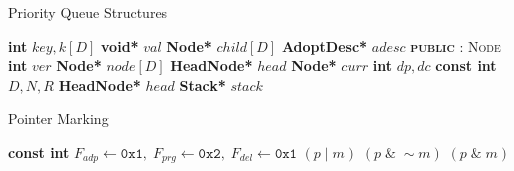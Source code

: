 \documentclass[10pt,journal,letter,compsoc]{IEEEtran}
\begin{document}
\setlength{\columnsep}{8pt}
\begin{algorithm}[t]
    \caption{Priority Queue Structures}
    \label{alg:pqstructure}
    \vspace{-0.1in}
    \begin{multicols}{2}
        \begin{algorithmic}[1]
            \State \textbf{int} $key, k[D]$
            \State \textbf{void*} $val$
            \State \textbf{Node*} $child[D]$
            \State \textbf{AdoptDesc*} $adesc$
            \EndStruct
            \Statex
            \State \textsc{\textbf{public} : Node}
            \State \textbf{int} $ver$
            \EndStruct
            \Statex
            \State \textbf{Node*} $node[D]$
            \State \textbf{HeadNode*} $head$
            \EndStruct
            \Statex
            \State \textbf{Node*} $curr$
            \State \textbf{int} $dp,dc$ 
            \EndStruct
            \Statex
            \State \textbf{const int} $D,N,R$
            \State \textbf{HeadNode*} $head$
            \State \textbf{Stack*} $stack$
            \EndClass
        \end{algorithmic}
    \end{multicols}
    \vspace{-0.1in}
\end{algorithm}

\begin{algorithm}[t]
    \caption{Pointer Marking}
    \label{alg:pointermarking}
    \begin{algorithmic}[1]
        \State \textbf{const int} $F_{adp} \gets \texttt{0x1},\;F_{prg} \gets \texttt{0x2},\;F_{del} \gets \texttt{0x1}$
         $(p\;|\;m)$
        \EndDefine
         $(p\;\&\;\sim m)$
        \EndDefine
         $(p\;\&\;m)$
        \EndDefine
    \end{algorithmic}
\end{algorithm}
\end{document}
